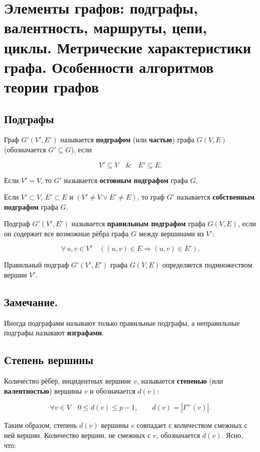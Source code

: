 {
	\section{Элементы графов: подграфы, валентность, маршруты, цепи, циклы. Метрические
характеристики графа. Особенности алгоритмов теории графов}

\subsection*{Подграфы}

Граф $G'(V', E')$ называется \textbf{подграфом} (или \textbf{частью}) графа $G(V, E)$ (обозначается $G' \subseteq G$), если


\[
V' \subseteq V \quad \& \quad E' \subseteq E.
\]



Если $V' = V$, то $G'$ называется \textbf{остовным подграфом} графа $G$.

Если $V' \subset V$, $E' \subset E$ и $(V' \neq V \lor E' \neq E)$, то граф $G'$ называется \textbf{собственным подграфом} графа $G$.

Подграф $G'(V', E')$ называется \textbf{правильным подграфом} графа $G(V, E)$, если он содержит все возможные рёбра графа $G$ между вершинами из $V'$:


\[
\forall \, u, v \in V'\quad ((u, v) \in E \Rightarrow (u, v) \in E').
\]



Правильный подграф $G'(V', E')$ графа $G(V, E)$ определяется подмножеством вершин $V'$.

\subsection*{Замечание.}
Иногда подграфами называют только правильные подграфы, а неправильные подграфы называют \textbf{изграфами}.


\subsection*{Степень вершины}

Количество рёбер, инцидентных вершине $v$, называется \textbf{степенью} (или \textbf{валентностью}) вершины $v$ и обозначается $d(v)$:


\[
\forall v \in V\quad 0 \leq d(v) \leq p - 1,\qquad d(v) = |\Gamma^+(v)|.
\]



Таким образом, степень $d(v)$ вершины $v$ совпадает с количеством смежных с ней вершин. Количество вершин, не смежных с $v$, обозначается $\overline{d}(v)$. Ясно, что:


}
